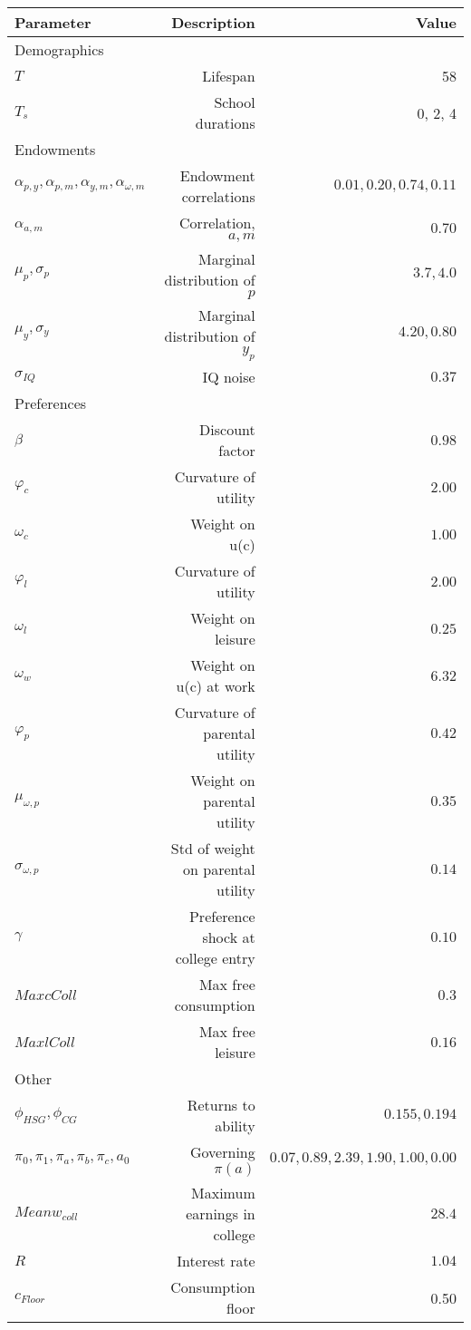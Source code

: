\begin{tabular}{lrr}
\hline
Parameter & Description  & Value  \\
\hline
Demographics &   &   \\
$T$ & Lifespan  & 58  \\
$T_{s}$ & School durations  & 0, 2, 4  \\
Endowments &   &   \\
$\alpha_{p,y}, \alpha_{p,m}, \alpha_{y,m}, \alpha_{\omega,m}$ & Endowment correlations  & $0.01, 0.20, 0.74, 0.11$  \\
$\alpha_{a,m}$ & Correlation, $a,m$  & $0.70$  \\
$\mu_{p}, \sigma_{p}$ & Marginal distribution of $p$  & $3.7, 4.0$  \\
$\mu_{y}, \sigma_{y}$ & Marginal distribution of $y_{p}$  & $4.20, 0.80$  \\
$\sigma_{IQ}$ & IQ noise  & $0.37$  \\
Preferences &   &   \\
$\beta$ & Discount factor  & $0.98$  \\
$\varphi_{c}$ & Curvature of utility  & $2.00$  \\
$\omega_{c}$ & Weight on u(c)  & $1.00$  \\
$\varphi_{l}$ & Curvature of utility  & $2.00$  \\
$\omega_{l}$ & Weight on leisure  & $0.25$  \\
$\omega_{w}$ & Weight on u(c) at work  & $6.32$  \\
$\varphi_{p}$ & Curvature of parental utility  & $0.42$  \\
$\mu_{\omega,p}$ & Weight on parental utility  & $0.35$  \\
$\sigma_{\omega,p}$ & Std of weight on parental utility  & $0.14$  \\
$\gamma$ & Preference shock at college entry  & $0.10$  \\
$Max cColl$ & Max free consumption  & $0.3$  \\
$Max lColl$ & Max free leisure  & $0.16$  \\
Other &   &   \\
$\phi_{HSG}, \phi_{CG}$ & Returns to ability  & $0.155, 0.194$  \\
$\pi_{0}, \pi_{1}, \pi_{a}, \pi_{b}, \pi_{c}, a_{0}$ & Governing $\pi(a)$  & $0.07, 0.89, 2.39, 1.90, 1.00, 0.00$  \\
$Mean w_{coll}$ & Maximum earnings in college  & $28.4$  \\
$R$ & Interest rate  & $1.04$  \\
$c_{Floor}$ & Consumption floor  & 0.50  \\
\hline
\end{tabular}%
